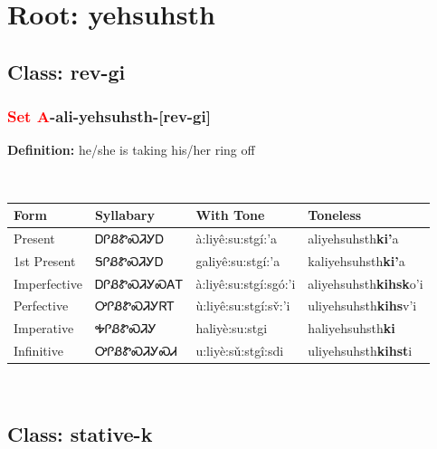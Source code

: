 \needspace{4in}
\section*{Root: yehsuhsth}
\nopagebreak
{}
\needspace{3in}
\subsection*{Class: rev-gi}
\nopagebreak
\needspace{2in}
\subsubsection*{\textcolor{Red}{Set A}{-}ali{-}\textbf{yehsuhsth}{-}[rev-gi]}
\nopagebreak
\textbf{Definition: } he/she is taking his/her ring off
\\[0.5em]
\begin{tabularx}{\textwidth}{l X X X}%
\toprule%
\textbf{Form}&\textbf{Syllabary}&\textbf{With Tone}&\textbf{Toneless}\\%
\midrule%
Present&ᎠᎵᏰᏑᏍᏘᎩᎠ&à:liyê:su:stgí:’a&aliyehsuhsth\textbf{ki'}a\\%
1st Present&ᎦᎵᏰᏑᏍᏘᎩᎠ&galiyê:su:stgí:’a&kaliyehsuhsth\textbf{ki'}a\\%
Imperfective&ᎠᎵᏰᏑᏍᏘᎩᏍᎪᎢ&à:liyê:su:stgí:sgó:’i&aliyehsuhsth\textbf{kihsk}o'i\\%
Perfective&ᎤᎵᏰᏑᏍᏘᎩᏒᎢ&ù:liyê:su:stgí:sv̌:’i&uliyehsuhsth\textbf{kihs}v'i\\%
Imperative&ᎭᎵᏰᏑᏍᏘᎩ&haliyè:su:stgi&haliyehsuhsth\textbf{ki}\\%
Infinitive&ᎤᎵᏰᏑᏍᏘᎩᏍᏗ&u:liyè:sǔ:stgî:sdi&uliyehsuhsth\textbf{kihst}i\\%
\bottomrule%
\end{tabularx}
\\[1em]
\needspace{3in}
\subsection*{Class: stative-k}
\nopagebreak
\needspace{2in}
